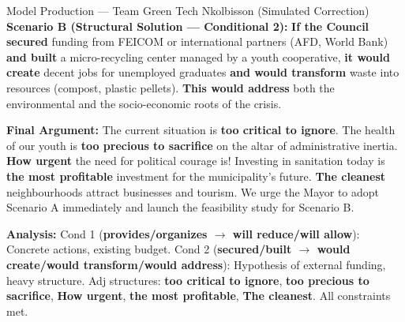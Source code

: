\documentclass[11pt]{article}
\begin{document}
\begin{exoresolu}{Model Production — Team \og Green Tech Nkolbisson \fg{} (Simulated Correction)}
\textbf{Scenario B (Structural Solution — Conditional 2):}
\textbf{If the Council secured} funding from FEICOM or international partners (AFD, World Bank) \textbf{and built} a micro-recycling center managed by a youth cooperative, \textbf{it would create} decent jobs for unemployed graduates \textbf{and would transform} waste into resources (compost, plastic pellets). \textbf{This would address} both the environmental and the socio-economic roots of the crisis.

\textbf{Final Argument:}
The current situation is \textbf{too critical to ignore}. The health of our youth is \textbf{too precious to sacrifice} on the altar of administrative inertia. \textbf{How urgent} the need for political courage is! Investing in sanitation today is \textbf{the most profitable} investment for the municipality's future. \textbf{The cleanest} neighbourhoods attract businesses and tourism. We urge the Mayor to adopt Scenario A immediately and launch the feasibility study for Scenario B.
\par \textbf{Analysis:} Cond 1 (\textbf{provides/organizes $\to$ will reduce/will allow}): Concrete actions, existing budget. Cond 2 (\textbf{secured/built $\to$ would create/would transform/would address}): Hypothesis of external funding, heavy structure. Adj structures: \textbf{too critical to ignore}, \textbf{too precious to sacrifice}, \textbf{How urgent}, \textbf{the most profitable}, \textbf{The cleanest}. All constraints met.


\end{exoresolu}
\end{document}
